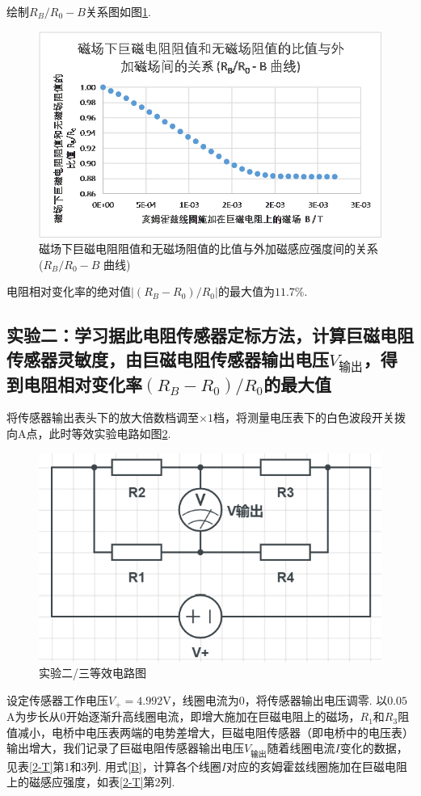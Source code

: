 \documentclass[UTF8,10pt,a4paper]{article}
\providecommand{\abs}[1]{\left\lvert#1\right\rvert}
\begin{document}
绘制$R_B/R_0-B$关系图如图\ref{1-F}.

\begin{figure}[h]
    \centering
    \includegraphics[width=.6\textwidth]{1-F.png}
    \caption{磁场下巨磁电阻阻值和无磁场阻值的比值与外加磁感应强度间的关系 ($R_B/R_0 - B$ 曲线)}
    \label{1-F}
\end{figure}

电阻相对变化率的绝对值$\abs{(R_B-R_0)/R_0}$的最大值为$11.7\%$.

\clearpage

\subsection{实验二：学习据此电阻传感器定标方法，计算巨磁电阻传感器灵敏度，由巨磁电阻传感器输出电压$V_{\text{输出}}$，得到电阻相对变化率$(R_B-R_0)/R_0$的最大值}

将传感器输出表头下的放大倍数档调至$\times 1$档，将测量电压表下的白色波段开关拨向A点，此时等效实验电路如图\ref{circuit-2}.

\begin{figure}[h]
    \centering
    \includegraphics[width=.4\textwidth]{Circuit-2.png}
    \caption{实验二/三等效电路图}
    \label{circuit-2}
\end{figure}

设定传感器工作电压$V_+=4.992$V，线圈电流为$0$，将传感器输出电压调零. 以$0.05$A为步长从$0$开始逐渐升高线圈电流，即增大施加在巨磁电阻上的磁场，$R_1$和$R_3$阻值减小，电桥中电压表两端的电势差增大，巨磁电阻传感器（即电桥中的电压表）输出增大，我们记录了巨磁电阻传感器输出电压$V_{\text{输出}}$随着线圈电流$I$变化的数据，见表\ref{2-T}第1和3列. 用式\ref{B}，计算各个线圈$I$对应的亥姆霍兹线圈施加在巨磁电阻上的磁感应强度，如表\ref{2-T}第2列.
\end{document}

